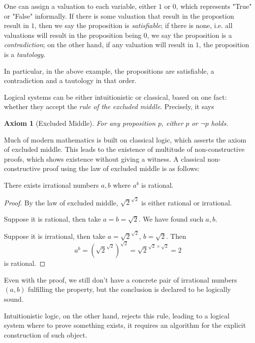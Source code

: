 One can assign a valuation to each variable, either $1$ or $0$, which represents
"True" or "False" informally. If there is some valuation that result in the
propostion result in $1$, then we say the proposition is \emph{satisfiable}; if 
there is none, i.e. all valuations will result in the proposition being $0$, 
we say the proposition is a \emph{contradiction}; on the other hand, if any 
valuation will result in $1$, the proposition is a \emph{tautology}.

In particular, in the above example, the propositions are satisfiable, a
contradiction and a tautology in that order.

Logical systems can be either intuitionistic or classical, based on one fact:
whether they accept the \emph{rule of the excluded middle}. Precisely, it says

\newtheorem{axiom}{Axiom}[section]
\begin{axiom}[Excluded Middle]
    For any proposition $p$, either $p$ or $\neg p$ holds.
\end{axiom}

Much of modern mathematics is built on classical logic, which asserts the axiom
of excluded middle. This leads to the existence of multitude of non-constructive 
proofs, which shows existence without giving a witness. A classical
non-constructive proof using the law of excluded middle is as follows:

\begin{theorem}
There exists irrational numbers $a, b$ where $a^b$ is rational.
\end{theorem}
\begin{proof}
By the law of excluded middle, $\sqrt{2}^{\sqrt{2}}$ is either rational or
irrational. 
    
Suppose it is rational, then take $a=b=\sqrt{2}$. We have found such $a,b$.

Suppose it is irrational, then take $a=\sqrt{2}^{\sqrt{2}}$, $b=\sqrt{2}$. Then
\[a^b={\left(\sqrt{2}^{\sqrt{2}}\right)}^{\sqrt{2}}=\sqrt{2}^{\sqrt{2}\times\sqrt{2}}=2\]
is rational.
\end{proof}

Even with the proof, we still don't have a concrete pair of irrational numbers
$(a,b)$ fulfilling the property, but the conclusion is declared to be logically
sound.

Intuitionistic logic, on the other hand, rejects this rule, leading to a logical
system where to prove something exists, it requires an algorithm for the
explicit construction of such object.


